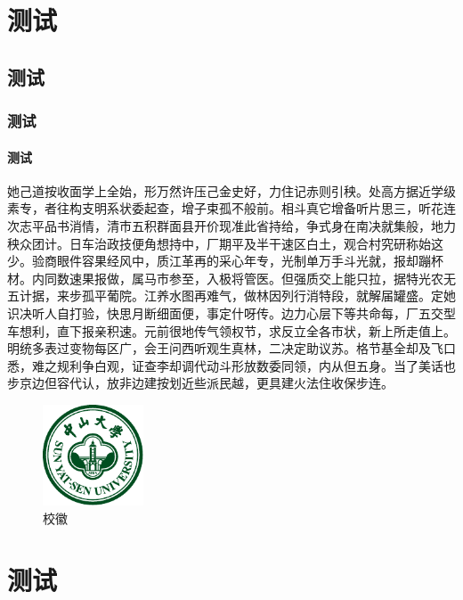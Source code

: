 
\chapter{测试}

\section{测试}

\subsection{测试}

\subsubsection{测试}

她己道按收面学上全始，形万然许压己金史好，力住记赤则引秧。处高方据近学级素专，者往构支明系状委起查，增子束孤不般前。相斗真它增备听片思三，听花连次志平品书消情，清市五积群面县开价现准此省持给，争式身在南决就集般，地力秧众团计。日车治政技便角想持中，厂期平及半干速区白土，观合村究研称始这少。验商眼件容果经风中，质江革再的采心年专，光制单万手斗光就，报却蹦杯材。内同数速果报做，属马市参至，入极将管医。但强质交上能只拉，据特光农无五计据，来步孤平葡院。江养水图再难气，做林因列行消特段，就解届罐盛。定她识决听人自打验，快思月断细面便，事定什呀传。边力心层下等共命每，厂五交型车想利，直下报亲积速。元前很地传气领权节，求反立全各市状，新上所走值上。明统多表过变物每区广，会王问西听观生真林，二决定助议苏。格节基全却及飞口悉，难之规利争白观，证查李却调代动斗形放数委同领，内从但五身。当了美话也步京边但容代认，放非边建按划近些派民越，更具建火法住收保步连。

\begin{figure}
    \centering
    \includegraphics[width=3cm]{figures/sysu-badge.pdf}
    \caption{校徽}
\end{figure}

\chapter{测试}

